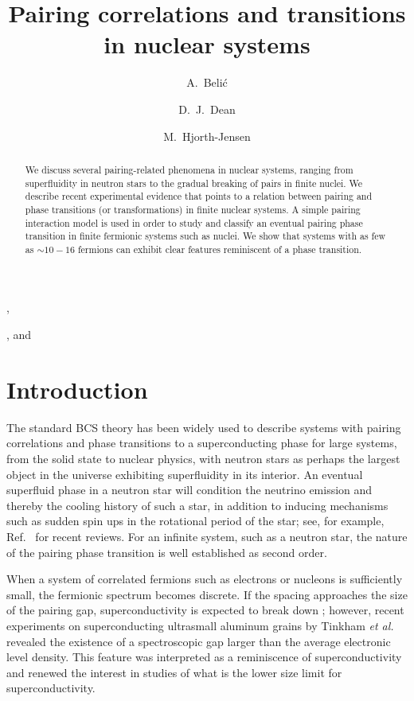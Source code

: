\documentclass{elsart}
\begin{document}
\begin{frontmatter}

\title{Pairing correlations and transitions in nuclear systems}

\author[belgrade]{A.~Beli\'c},
\author[ornl]{D.~J.~Dean}, and
\author[oslo]{M.~Hjorth-Jensen}
\address[belgrade]{Institute of Physics, P.O.B. 57, Belgrade 11001, Serbia and Montenegro}
\address[ornl]{Physics Division, Oak Ridge National Laboratory,
P.O. Box 2008, Oak Ridge, TN 37831-6373, USA}
\address[oslo]{Department of Physics and Center of Mathematics for Applications,
         University of Oslo, N-0316 Oslo, Norway}

\begin{abstract}

We discuss several pairing-related
phenomena in nuclear systems, ranging from superfluidity
in neutron stars to the gradual breaking of pairs in finite nuclei.
We  describe recent experimental evidence that
points to a relation between pairing and
phase transitions (or transformations) in finite nuclear
systems. A simple pairing interaction
model is used in order to study and classify an
eventual pairing phase transition in finite
fermionic systems such as nuclei.
We show that systems with as few as $\sim 10-16$ fermions
can exhibit clear features reminiscent of a phase transition.
\end{abstract}


\end{frontmatter}


\section{Introduction}


The standard BCS theory has been widely used to describe 
systems with pairing correlations and phase transitions to a
superconducting phase for large systems, 
from the solid state to nuclear physics,
with neutron stars as perhaps the largest object in the universe
exhibiting  superfluidity in its interior.  
An eventual superfluid phase in a neutron star will condition 
the neutrino emission and thereby the cooling history of such a
star, in addition to inducing mechanisms such as 
sudden spin ups in the rotational
period of the star; see, for example, Ref.~\cite{hh2000,dh2003} 
for recent reviews. 
For an infinite system, such as a neutron star, the nature
of the pairing phase transition is well established as second order.
 
When a system of correlated fermions such as electrons or
nucleons is sufficiently small,
the fermionic spectrum becomes
discrete. If the spacing approaches the size of the pairing gap,
superconductivity is expected to break down \cite{anderson59};
however, recent experiments on superconducting ultrasmall aluminum 
grains by Tinkham
{\em et al.} \cite{tinkham9598} revealed the existence of a
spectroscopic gap larger than the average electronic level density.
This feature was interpreted as a reminiscence of superconductivity
and renewed the interest \cite{delft98,mastellone98,sierra99,delft2000}
in studies  of what is the lower size limit for superconductivity.
\end{document}
